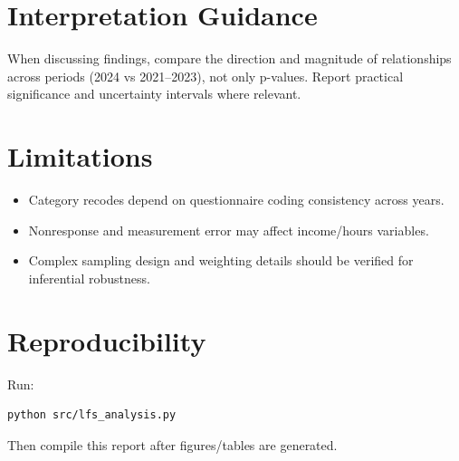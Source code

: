 \documentclass[12pt]{article}
\begin{document}
\section{Interpretation Guidance}
When discussing findings, compare the direction and magnitude of relationships across periods (2024 vs 2021--2023), not only p-values. Report practical significance and uncertainty intervals where relevant.

\section{Limitations}
\begin{itemize}
    \item Category recodes depend on questionnaire coding consistency across years.
    \item Nonresponse and measurement error may affect income/hours variables.
    \item Complex sampling design and weighting details should be verified for inferential robustness.
\end{itemize}

\section{Reproducibility}
Run:
\begin{verbatim}
python src/lfs_analysis.py
\end{verbatim}
Then compile this report after figures/tables are generated.
\end{document}
